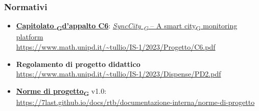 \subsubsection{Normativi}
\begin{itemize}
	\item \href{https://7last.github.io/docs/rtb/documentazione-interna/glossario\#capitolato}{\textbf{Capitolato \textsubscript{G}d'appalto C6}}: \href{https://7last.github.io/docs/rtb/documentazione-interna/glossario\#synccity}{\textit{SyncCity \textsubscript{G}} – A \href{https://7last.github.io/docs/rtb/documentazione-interna/glossario\#smart-city}{smart city\textsubscript{G}} monitoring platform}\\
	\url{https://www.math.unipd.it/~tullio/IS-1/2023/Progetto/C6.pdf}
	\item \textbf{Regolamento di progetto didattico}\\
	      \url{https://www.math.unipd.it/~tullio/IS-1/2023/Dispense/PD2.pdf}
	\item \href{https://7last.github.io/docs/rtb/documentazione-interna/glossario\#norme-di-progetto}{\textbf{Norme di progetto\textsubscript{G}}} v1.0:\\
	\url{https://7last.github.io/docs/rtb/documentazione-interna/norme-di-progetto}
\end{itemize}
\newpage